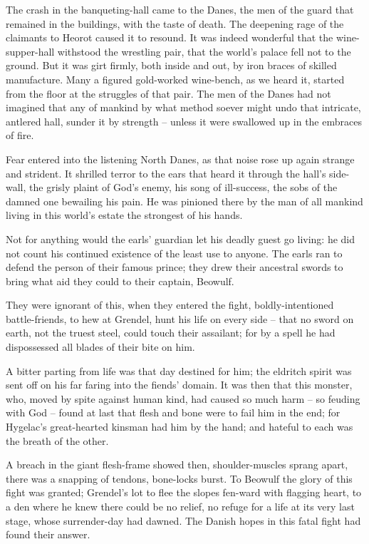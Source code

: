 \documentclass[a4paper]{article}
\begin{document}
{{The crash in the banqueting-hall came to the Danes,
the men of the guard that remained in the buildings,
with the taste of death. The deepening rage
of the claimants to Heorot caused it to resound.
It was indeed wonderful that the wine-supper-hall
withstood the wrestling pair, that the world’s palace
fell not to the ground. But it was girt firmly,
both inside and out, by iron braces
of skilled manufacture. Many a figured
gold-worked wine-bench, as we heard it,
started from the floor at the struggles of that pair.
The men of the Danes had not imagined that
any of mankind by what method soever
might undo that intricate, antlered hall,
sunder it by strength – unless it were swallowed up in
the embraces of fire.

Fear entered into
the listening North Danes, as that noise rose up again
strange and strident. It shrilled terror
to the ears that heard it through the hall’s side-wall,
the grisly plaint of God’s enemy,
his song of ill-success, the sobs of the damned one
bewailing his pain. He was pinioned there
by the man of all mankind living
in this world’s estate the strongest of his hands.

Not for anything would the earls’ guardian
let his deadly guest go living:
he did not count his continued existence
of the least use to anyone. The earls ran
to defend the person of their famous prince;
they drew their ancestral swords to bring
what aid they could to their captain, Beowulf.

They were ignorant of this, when they entered the fight,
boldly-intentioned battle-friends,
to hew at Grendel, hunt his life
on every side – that no sword on earth,
not the truest steel, could touch their assailant;
for by a spell he had dispossessed all
blades of their bite on him.

A bitter parting
from life was that day destined for him;
the eldritch spirit was sent off on his
far faring into the fiends’ domain.
It was then that this monster, who, moved by spite
against human kind, had caused so much harm
– so feuding with God – found at last
that flesh and bone were to fail him in the end;
for Hygelac’s great-hearted kinsman
had him by the hand; and hateful to each
was the breath of the other.

A breach in the giant
flesh-frame showed then, shoulder-muscles
sprang apart, there was a snapping of tendons,
bone-locks burst. To Beowulf the glory
of this fight was granted; Grendel’s lot
to flee the slopes fen-ward with flagging heart,
to a den where he knew there could be no relief,
no refuge for a life at its very last stage,
whose surrender-day had dawned. The Danish hopes
in this fatal fight had found their answer.}

}
\end{document}

